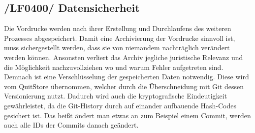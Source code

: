 \subsection{/LF0400/ Datensicherheit}
Die Vordrucke werden nach ihrer Erstellung und Durchlaufens des weiteren Prozesses abgespeichert.
Damit eine Archivierung der Vordrucke sinnvoll ist, muss sichergestellt werden, dass sie von niemandem  
nachträglich verändert werden können. Ansonsten verliert das Archiv jegliche juristische Relevanz und die Möglichkeit nachzuvollziehen wo und warum Fehler aufgetreten sind. Demnach ist eine Verschlüsselung der gespeicherten Daten notwendig. Diese wird vom QuitStore übernommen, welcher durch die Überschneidung mit Git dessen Versionierung nutzt. Dadurch wird auch die kryptografische Eindeutigkeit gewährleistet, da die Git-History durch auf einander aufbauende Hash-Codes gesichert ist. Das heißt ändert man etwas an zum Beispiel einem Commit, werden auch alle IDs der Commits danach geändert.